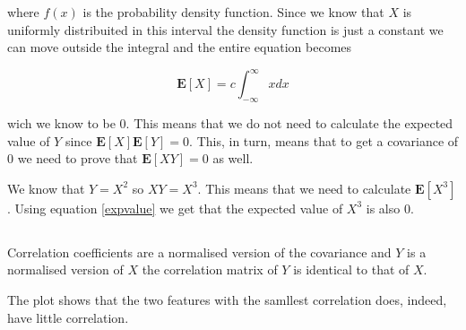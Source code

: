\documentclass{article}
\begin{document}
where $f(x)$ is the probability density function. Since we know that $X$ is
uniformly distribuited in this interval the density function is just a constant
we can move outside the integral and the entire equation becomes

\begin{equation}
  \mathbf{E}[X] = c \int_{-\infty}^{\infty} x dx
\end{equation}

wich we know to be $0$. This means that we do not need to calculate the
expected value of $Y$ since $\mathbf{E}[X]\mathbf{E}[Y] = 0$. This, in turn,
means that to get a covariance of $0$ we need to prove that $\mathbf{E}[XY] =
0$ as well.

We know that $Y = X^2$ so $XY = X^3$. This means that we need to calculate
$\mathbf{E}[X^3]$. Using equation \ref{expvalue} we get that the expected value
of $X^3$ is also $0$.

\setcounter{section}{2}
\subsection{}

\subsection{}

Correlation coefficients are a normalised version of the covariance and $Y$ is
a normalised version of $X$ the correlation matrix of $Y$ is identical to that
of $X$.

The plot shows that the two features with the samllest correlation does,
indeed, have little correlation.
\end{document}
